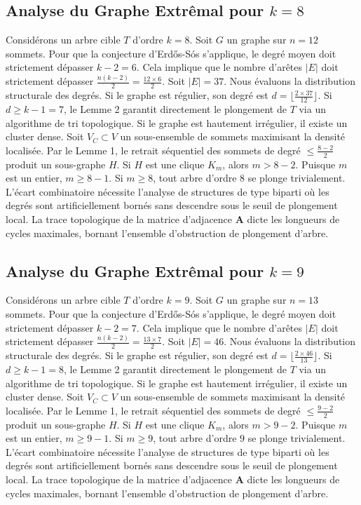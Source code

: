 \documentclass[11pt,a4paper]{article}
\begin{document}
\subsection{Analyse du Graphe Extr\^emal pour $k=8$}
Consid\'erons un arbre cible $T$ d'ordre $k=8$.
Soit $G$ un graphe sur $n=12$ sommets.
Pour que la conjecture d'Erd\H{o}s-S\'os s'applique, le degr\'e moyen doit strictement d\'epasser $k-2 = 6$.
Cela implique que le nombre d'ar\^etes $|E|$ doit strictement d\'epasser $\frac{n(k-2)}{2} = \frac{12 \times 6}{2}$.
Soit $|E| = 37$.
Nous \'evaluons la distribution structurale des degr\'es. Si le graphe est r\'egulier, son degr\'e est $d = \lfloor \frac{2 \times 37}{12} \rfloor$.
Si $d \geq k-1 = 7$, le Lemme 2 garantit directement le plongement de $T$ via un algorithme de tri topologique.
Si le graphe est hautement irr\'egulier, il existe un cluster dense. Soit $V_C \subset V$ un sous-ensemble de sommets maximisant la densit\'e localis\'ee.
Par le Lemme 1, le retrait s\'equentiel des sommets de degr\'e $\leq \frac{8-2}{2}$ produit un sous-graphe $H$.
Si $H$ est une clique $K_{m}$, alors $m > 8-2$. Puisque $m$ est un entier, $m \geq 8-1$. Si $m \geq 8$, tout arbre d'ordre $8$ se plonge trivialement.
L'\'ecart combinatoire n\'ecessite l'analyse de structures de type biparti o\`u les degr\'es sont artificiellement born\'es sans descendre sous le seuil de plongement local. La trace topologique de la matrice d'adjacence $\mathbf{A}$ dicte les longueurs de cycles maximales, bornant l'ensemble d'obstruction de plongement d'arbre.


\subsection{Analyse du Graphe Extr\^emal pour $k=9$}
Consid\'erons un arbre cible $T$ d'ordre $k=9$.
Soit $G$ un graphe sur $n=13$ sommets.
Pour que la conjecture d'Erd\H{o}s-S\'os s'applique, le degr\'e moyen doit strictement d\'epasser $k-2 = 7$.
Cela implique que le nombre d'ar\^etes $|E|$ doit strictement d\'epasser $\frac{n(k-2)}{2} = \frac{13 \times 7}{2}$.
Soit $|E| = 46$.
Nous \'evaluons la distribution structurale des degr\'es. Si le graphe est r\'egulier, son degr\'e est $d = \lfloor \frac{2 \times 46}{13} \rfloor$.
Si $d \geq k-1 = 8$, le Lemme 2 garantit directement le plongement de $T$ via un algorithme de tri topologique.
Si le graphe est hautement irr\'egulier, il existe un cluster dense. Soit $V_C \subset V$ un sous-ensemble de sommets maximisant la densit\'e localis\'ee.
Par le Lemme 1, le retrait s\'equentiel des sommets de degr\'e $\leq \frac{9-2}{2}$ produit un sous-graphe $H$.
Si $H$ est une clique $K_{m}$, alors $m > 9-2$. Puisque $m$ est un entier, $m \geq 9-1$. Si $m \geq 9$, tout arbre d'ordre $9$ se plonge trivialement.
L'\'ecart combinatoire n\'ecessite l'analyse de structures de type biparti o\`u les degr\'es sont artificiellement born\'es sans descendre sous le seuil de plongement local. La trace topologique de la matrice d'adjacence $\mathbf{A}$ dicte les longueurs de cycles maximales, bornant l'ensemble d'obstruction de plongement d'arbre.
\end{document}
